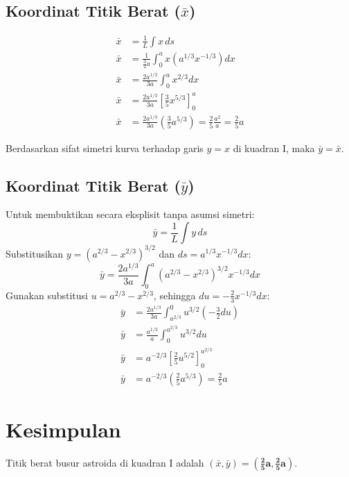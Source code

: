\documentclass[12pt,a4paper]{article}
\begin{document}
\subsection{Koordinat Titik Berat ($\bar{x}$)}
\begin{align*}
  \bar{x} &= \frac{1}{L} \int x \, ds \\
  \bar{x} &= \frac{1}{\frac{3}{2}a} \int_{0}^{a} x (a^{1/3} x^{-1/3}) dx \\
  \bar{x} &= \frac{2 a^{1/3}}{3a} \int_{0}^{a} x^{2/3} dx \\
  \bar{x} &= \frac{2 a^{1/3}}{3a} \left[ \frac{3}{5} x^{5/3} \right]_0^a \\
  \bar{x} &= \frac{2 a^{1/3}}{3a} \left( \frac{3}{5} a^{5/3} \right) = \frac{2}{5} \frac{a^2}{a} = \frac{2}{5}a
\end{align*}

Berdasarkan sifat simetri kurva terhadap garis $y = x$ di kuadran I, maka $\bar{y} = \bar{x}$.

\subsection{Koordinat Titik Berat ($\bar{y}$)}
Untuk membuktikan secara eksplisit tanpa asumsi simetri:
\begin{equation*}
  \bar{y} = \frac{1}{L} \int y \, ds
\end{equation*}
Substitusikan $y = (a^{2/3} - x^{2/3})^{3/2}$ dan $ds = a^{1/3} x^{-1/3} dx$:
\begin{equation*}
  \bar{y} = \frac{2 a^{1/3}}{3a} \int_{0}^{a} (a^{2/3} - x^{2/3})^{3/2} x^{-1/3} dx
\end{equation*}
Gunakan substitusi $u = a^{2/3} - x^{2/3}$, sehingga $du = -\frac{2}{3}x^{-1/3} dx$:
\begin{align*}
  \bar{y} &= \frac{2 a^{1/3}}{3a} \int_{a^{2/3}}^{0} u^{3/2} \left( -\frac{3}{2} du \right) \\
  \bar{y} &= \frac{a^{1/3}}{a} \int_{0}^{a^{2/3}} u^{3/2} du \\
  \bar{y} &= a^{-2/3} \left[ \frac{2}{5} u^{5/2} \right]_0^{a^{2/3}} \\
  \bar{y} &= a^{-2/3} \left( \frac{2}{5} a^{5/3} \right) = \frac{2}{5} a
\end{align*}

\section{Kesimpulan}
Titik berat busur astroida di kuadran I adalah $(\bar{x}, \bar{y}) = \mathbf{\left(\frac{2}{5}a, \frac{2}{5}a\right)}$.
\end{document}

